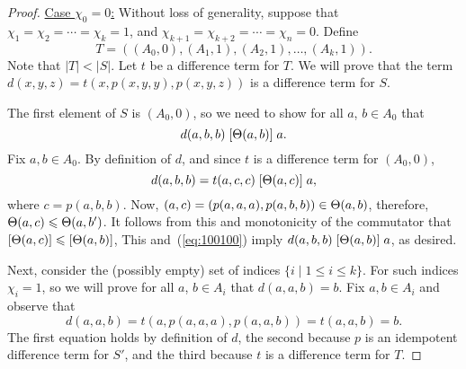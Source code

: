 \begin{proof}
  \medskip

\noindent \underline{Case $\chi_0 = 0$:}
Without loss of generality, suppose that
$\chi_1 = \chi_2 = \cdots =\chi_k = 1$,
and
$\chi_{k+1} = \chi_{k+2} = \cdots = \chi_{n} = 0$.
Define
\[
T = ((A_0, 0), (A_1, 1), (A_2, 1), \dots, (A_k, 1)).
\]
Note that $|T| < |S|$.
Let $t$ be a \glocal difference term for $T$.
We will prove that the term $d(x,y,z) = t(x, p(x,y,y), p(x,y,z))$
is a \glocal difference term for $S$.

The first element of $S$ is $(A_0, 0)$, so we need to show for all $a$, $b \in A_0$
that
\[
d(a,b,b) \mathrel{[\Theta(a,b)]} a.
\]
Fix $a, b \in A_0$.
By definition of $d$, and since
$t$ is a \glocal difference term for $(A_0, 0)$,
\begin{equation}
  \label{eq:100100}
  d(a,b,b)
  =t(a, c, c)\mathrel{[\Theta(a, c)]} a,
\end{equation}
where $c = p(a,b,b)$.
Now, $(a, c) = (p(a,a,a), p(a,b,b)) \in \Theta(a, b)$, therefore,
$\Theta(a, c) \leqslant \Theta(a,b')$.
It follows from this and monotonicity of the commutator that
$[\Theta(a, c)] \leqslant [\Theta(a,b)]$,
This and~(\ref{eq:100100}) imply
$d(a,b,b)\mathrel{[\Theta(a,b)]} a$,
as desired.

Next, consider the (possibly empty) set of indices $\{i \mid 1\leq i \leq k\}$.
For such indices $\chi_i =1$, so we will prove
for all $a$, $b \in A_i$ that $d(a,a,b) = b$.
Fix $a, b \in A_i$ and observe that
\[
  d(a,a,b) =
  t(a, p(a,a,a), p(a,a,b)) %
  =t(a,a,b) %
  =b. %
\]
The first equation holds by definition of $d$, the second
because $p$ is an idempotent \glocal difference term for
$S'$, and the third because $t$ is a \glocal difference term for $T$.


\end{proof}

